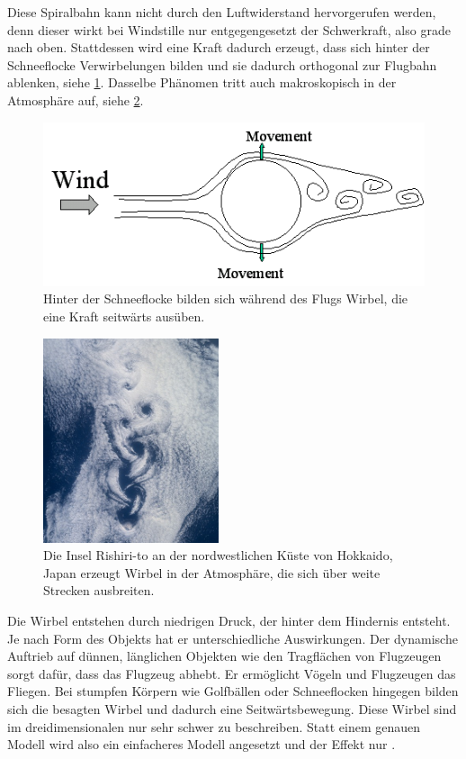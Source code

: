 Diese Spiralbahn kann nicht durch den Luftwiderstand hervorgerufen
werden, denn dieser wirkt bei Windstille nur entgegengesetzt der
Schwerkraft, also grade nach oben. Stattdessen wird eine Kraft dadurch
erzeugt, dass sich hinter der Schneeflocke Verwirbelungen bilden und
sie dadurch orthogonal zur Flugbahn ablenken, siehe
\cref{fig:implementation_snowflake_vortex_shedding}. Dasselbe
Phänomen tritt auch makroskopisch in der Atmosphäre auf, siehe
\cref{fig:implementation_snowflake_vortex_shedding_macroscopic}.

\begin{figure}[ht]
    \centering
    \includegraphics{images/vortex_shedding}
    \caption{Hinter der Schneeflocke bilden sich während des Flugs Wirbel, die eine Kraft seitwärts ausüben.}
\label{fig:implementation_snowflake_vortex_shedding}
\end{figure}

\begin{figure}[ht]
    \centering
    \includegraphics{images/vortex_shedding_macroscopic}
    \caption{Die Insel Rishiri-to an der nordwestlichen Küste von Hokkaido, Japan erzeugt Wirbel in der Atmosphäre, die sich über weite Strecken ausbreiten.}
\label{fig:implementation_snowflake_vortex_shedding_macroscopic}
\end{figure}

Die Wirbel entstehen durch niedrigen Druck, der hinter dem Hindernis
entsteht. Je nach Form des Objekts hat er unterschiedliche
Auswirkungen. Der dynamische Auftrieb auf dünnen, länglichen Objekten
wie den Tragflächen von Flugzeugen sorgt dafür, dass das Flugzeug
abhebt. Er ermöglicht Vögeln und Flugzeugen das Fliegen. Bei stumpfen
Körpern wie Golfbällen oder Schneeflocken hingegen bilden sich die
besagten Wirbel und dadurch eine Seitwärtsbewegung. Diese Wirbel sind
im dreidimensionalen nur sehr schwer zu beschreiben. Statt einem
genauen Modell wird also ein einfacheres Modell angesetzt und der
Effekt nur .

